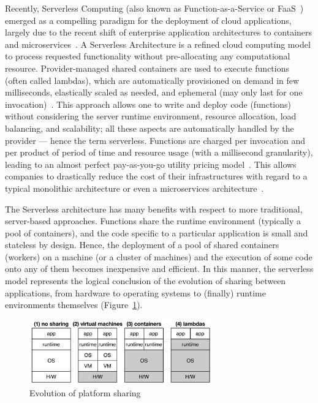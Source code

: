 
Recently, Serverless Computing (also known as Function-as-a-Service or FaaS~\cite{MateosFaaster17}) emerged as a compelling paradigm for the deployment of cloud applications, largely due to the recent shift of enterprise application architectures to containers and microservices~\cite{baldini2017serverless}.  A Serverless Architecture is a refined cloud computing model to process requested functionality without pre-allocating any computational resource. Provider-managed shared containers are used to execute functions (often called lambdas), which are automatically provisioned on demand in few milliseconds, elastically scaled as needed, and ephemeral (may only last for one invocation)~\cite{Roberts:2016}. This approach allows one to write and deploy code (functions) without considering the server runtime environment, resource allocation, load balancing, and scalability; all these aspects are automatically handled by the provider --- hence the term serverless. Functions are charged per invocation and per product of period of time and resource usage (with a millisecond granularity), leading to an almost perfect pay-as-you-go utility pricing model~\cite{MateosFaaster17}.  This allows companies to drastically reduce the cost of their infrastructures with regard to a typical monolithic architecture or even a microservices architecture~\cite{Villamizar2017lambda}.

The Serverless architecture has many benefits with respect to more traditional, server-based approaches. Functions share the runtime environment (typically a pool of containers), and the code specific to a particular application is small and stateless by design. Hence, the deployment of a pool of shared containers (workers) on a machine (or a cluster of machines) and the execution of some code onto any of them becomes inexpensive and efficient. In this manner, the serverless model represents the logical conclusion of the evolution of sharing between applications, from hardware to operating systems to (finally) runtime environments themselves (Figure~\ref{fig:Evolution-of-Sharing}).

\begin{figure}
  \centering
    \includegraphics[width=0.7\textwidth]{figs/evolution-platform-sharing.png}    
    \caption{Evolution of platform sharing~\cite{Hendrickson:2016}}
    \label{fig:Evolution-of-Sharing}
\end{figure}


